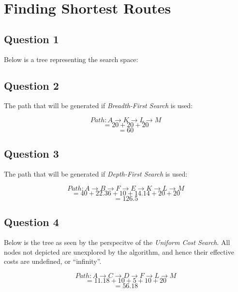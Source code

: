 \section{Finding Shortest Routes}

  \subsection{Question 1}

  Below is a tree representing the search space:

  \bigskip

  \begin{flushleft}
    
  \end{flushleft}

  \pagebreak

  \subsection{Question 2}

    The path that will be generated if \textit{Breadth-First Search} is used:

      $$Path: A \rightarrow K \rightarrow L \rightarrow M$$
      $$ = 20 + 20 + 20 $$
      $$= 60$$

  \subsection{Question 3}

    The path that will be generated if \textit{Depth-First Search} is used:

      $$Path: A \rightarrow B \rightarrow F \rightarrow E \rightarrow K \rightarrow L \rightarrow M $$
      $$ = 40+22.36+10+14.14+20+20$$
      $$=126.5$$

  \subsection{Question 4}

  Below is the tree as seen by the perspecitve of the \textit{Uniform Cost Search}. All nodes not
  depicted are unexplored by the algorithm, and hence their effective costs are undefined, or
  ``infinity''.

    $$Path:A \rightarrow C \rightarrow D \rightarrow F \rightarrow L \rightarrow M$$
    $$ = 11.18 + 10 + 5 + 10 + 20 $$
    $$ = 56.18 $$

  \bigskip

  \begin{flushleft}
    
  \end{flushleft}

